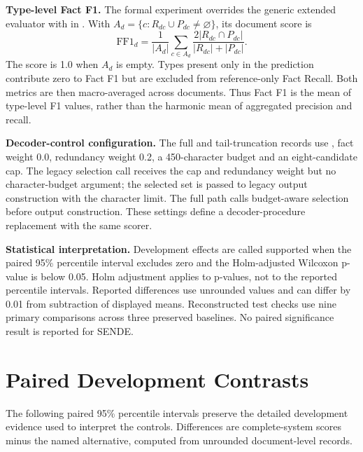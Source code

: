 \documentclass[10pt,twocolumn,letterpaper]{article}
\begin{document}
\par\noindent\begin{minipage}{\columnwidth}
\textbf{Type-level Fact F1.} The formal experiment overrides the generic extended evaluator with  in . With $A_d=\{c:R_{dc}\cup P_{dc}\ne\varnothing\}$, its document score is
\begin{equation}
\mathrm{FF1}_d=\frac{1}{|A_d|}\sum_{c\in A_d}
\frac{2|R_{dc}\cap P_{dc}|}{|R_{dc}|+|P_{dc}|}.
\end{equation}
The score is 1.0 when $A_d$ is empty. Types present only in the prediction contribute zero to Fact F1 but are excluded from reference-only Fact Recall. Both metrics are then macro-averaged across documents. Thus Fact F1 is the mean of type-level F1 values, rather than the harmonic mean of aggregated precision and recall.

\end{minipage}\par\smallskip

\textbf{Decoder-control configuration.} The full and tail-truncation records use , fact weight 0.0, redundancy weight 0.2, a 450-character budget and an eight-candidate cap. The legacy selection call receives the cap and redundancy weight but no character-budget argument; the selected set is passed to legacy output construction with the character limit. The full path calls budget-aware selection before output construction. These settings define a decoder-procedure replacement with the same scorer.

\textbf{Statistical interpretation.} Development effects are called supported when the paired 95\% percentile interval excludes zero and the Holm-adjusted Wilcoxon p-value is below 0.05. Holm adjustment applies to p-values, not to the reported percentile intervals. Reported differences use unrounded values and can differ by 0.01 from subtraction of displayed means. Reconstructed test checks use nine primary comparisons across three preserved baselines. No paired significance result is reported for SENDE.


\section{Paired Development Contrasts}\label{appendix-h-paired-contrasts}
The following paired 95\% percentile intervals preserve the detailed development evidence used to interpret the controls. Differences are complete-system scores minus the named alternative, computed from unrounded document-level records.
\end{document}
